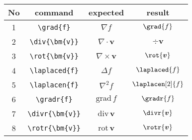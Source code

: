 \documentclass{jsarticle}
\begin{document}
%
\begin{table}[htpt]
\centering
\begin{tabular}{cccc}
No & command & expected & result \\
\hline
1& \verb|\grad{f}|						& $\displaystyle \nabla f$
										& $\displaystyle \grad{f}$ \\[3mm]
2& \verb|\div{\bm{v}}|					& $\displaystyle \nabla\cdot\bm{v}$
										& $\displaystyle \div{\bm{v}}$ \\[3mm]
3& \verb|\rot{\bm{v}}|					& $\displaystyle \nabla\times\bm{v}$
										& $\displaystyle \rot{\bm{v}}$ \\[3mm]
4& \verb|\laplaced{f}|					& $\displaystyle \Delta f$
										& $\displaystyle \laplaced{f}$ \\[3mm]
5& \verb|\laplacen{f}|					& $\displaystyle \nabla^2 f$
										& $\displaystyle \laplacen[2]{f}$ \\[3mm]
6& \verb|\gradr{f}|						& $\displaystyle \textrm{grad}\, f$
										& $\displaystyle \gradr{f}$ \\[3mm]
7& \verb|\divr{\bm{v}}|					& $\displaystyle \textrm{div}\, \bm{v}$
										& $\displaystyle \divr{\bm{v}}$ \\[3mm]
8& \verb|\rotr{\bm{v}}|					& $\displaystyle \textrm{rot}\, \bm{v}$
										& $\displaystyle \rotr{\bm{v}}$ \\[3mm]
\end{tabular}
\end{table}
\end{document}
